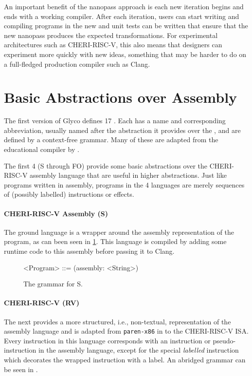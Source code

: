 \documentclass[main.tex]{subfiles}
\begin{document}
An important benefit of the nanopass approach is each new iteration begins and ends with a working compiler. After each iteration, users can start writing and compiling programs in the new \il{} and unit tests can be written that ensure that the new \gls{nanopass} produces the expected transformations. For experimental architectures such as CHERI-RISC-V, this also means that designers can experiment more quickly with new ideas, something that may be harder to do on a full-fledged production compiler such as Clang.

\section{Basic Abstractions over Assembly}
The first version of Glyco defines 17 \ils{}. Each \il{} has a name and corresponding abbreviation, usually named after the abstraction it provides over the \lowerlang{}, and are defined by a context-free grammar. Many of these \ils{} are adapted from the educational compiler by \cite{compcourse}.

The first 4 \ils{} (S through FO) provide some basic abstractions over the CHERI-RISC-V assembly language that are useful in higher abstractions. Just like programs written in assembly, programs in the 4 languages are merely sequences of (possibly labelled) instructions or effects.

\paragraph{CHERI-RISC-V Assembly (S)} The ground language is a wrapper around the assembly representation of the program, as can been seen in \cref{bnf:s}. This language is compiled by adding some runtime code to this assembly before passing it to Clang.
\begin{figure}[ht]
	\small
	\begin{grammar}
		<Program> ::= (assembly: <String>)
	\end{grammar}
	\caption{The grammar for S.}
	\label{bnf:s}
\end{figure}

\paragraph{CHERI-RISC-V (RV)} The next \il{} provides a more structured, i.e., non-textual, representation of the assembly language and is adapted from \texttt{paren-x86} in \cite{compcourse} to the CHERI-RISC-V ISA. Every instruction in this language corresponds with an instruction or pseudo-instruction in the assembly language, except for the special \emph{labelled} instruction which decorates the wrapped instruction with a label. An abridged grammar can be seen in .
\end{document}
